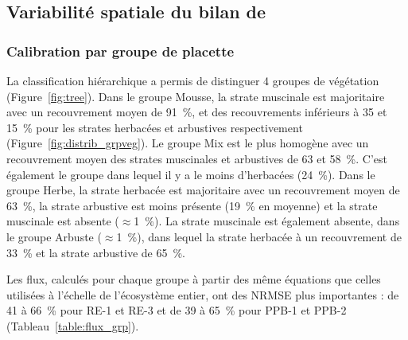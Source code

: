 \subsection{Variabilité spatiale du bilan de \coo}

\subsubsection{Calibration par groupe de placette}



La classification hiérarchique a permis de distinguer 4 groupes de végétation (Figure~\ref{fig:tree}).
Dans le groupe Mousse, la strate muscinale est majoritaire avec un recouvrement moyen de \SI{91}{\percent}, et des recouvrements inférieurs à \num{35} et \SI{15}{\percent} pour les strates herbacées et arbustives respectivement (Figure~\ref{fig:distrib_grpveg}).
Le groupe Mix est le plus homogène avec un recouvrement moyen des strates muscinales et arbustives de \num{63} et \SI{58}{\percent}.
C'est également le groupe dans lequel il y a le moins d'herbacées (\SI{24}{\percent}).
Dans le groupe Herbe, la strate herbacée est majoritaire avec un recouvrement moyen de \SI{63}{\percent}, la strate arbustive est moins présente (\SI{19}{\percent} en moyenne) et la strate muscinale est absente ($\approx$\SI{1}{\percent}).
La strate muscinale est également absente, dans le groupe Arbuste ($\approx$\SI{1}{\percent}), dans lequel la strate herbacée à un recouvrement de \SI{33}{\percent} et la strate arbustive de \SI{65}{\percent}.

Les flux, calculés pour chaque groupe à partir des même équations que celles utilisées à l'échelle de l'écosystème entier, ont des NRMSE plus importantes : de \num{41} à \SI{66}{\percent} pour RE-1 et RE-3 et de \num{39} à \SI{65}{\percent} pour PPB-1 et PPB-2 (Tableau~\ref{table:flux_grp}).

